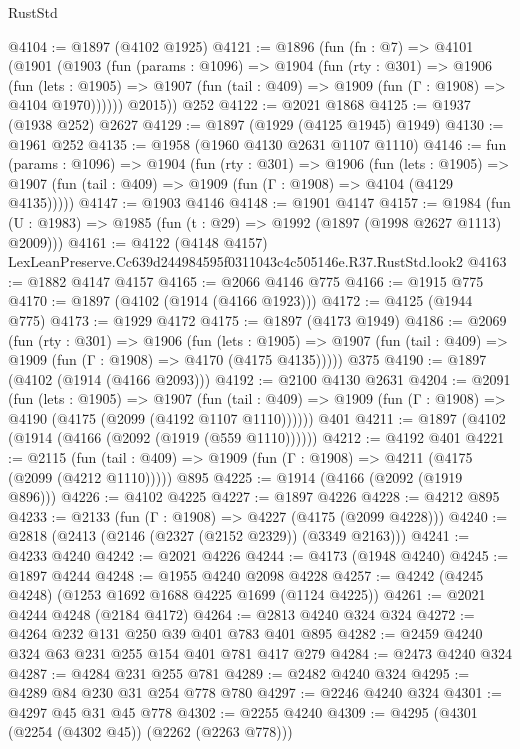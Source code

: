 \begin{lexlean}{RustStd}
\begin{coremodule}
@4104 := @1897 (@4102 @1925)
@4121 := @1896
    (fun (fn : @7) =>
    @4101
      (@1901
        (@1903
          (fun (params : @1096) =>
          @1904
            (fun (rty : @301) =>
            @1906
              (fun (lets : @1905) =>
              @1907 (fun (tail : @409) => @1909 (fun (Γ : @1908) => @4104 @1970))))))
        @2015))
    @252
@4122 := @2021 @1868
@4125 := @1937 (@1938 @252) @2627
@4129 := @1897 (@1929 (@4125 @1945) @1949)
@4130 := @1961 @252
@4135 := @1958 (@1960 @4130 @2631 @1107 @1110)
@4146 := fun (params : @1096) =>
  @1904
    (fun (rty : @301) =>
    @1906
      (fun (lets : @1905) =>
      @1907 (fun (tail : @409) => @1909 (fun (Γ : @1908) => @4104 (@4129 @4135)))))
@4147 := @1903 @4146
@4148 := @1901 @4147
@4157 := @1984 (fun (U : @1983) => @1985 (fun (t : @29) => @1992 (@1897 (@1998 @2627 @1113) @2009)))
@4161 := @4122 (@4148 @4157) LexLeanPreserve.Cc639d244984595f0311043c4c505146e.R37.RustStd.look2
@4163 := @1882 @4147 @4157
@4165 := @2066 @4146 @775
@4166 := @1915 @775
@4170 := @1897 (@4102 (@1914 (@4166 @1923)))
@4172 := @4125 (@1944 @775)
@4173 := @1929 @4172
@4175 := @1897 (@4173 @1949)
@4186 := @2069
    (fun (rty : @301) =>
    @1906
      (fun (lets : @1905) =>
      @1907 (fun (tail : @409) => @1909 (fun (Γ : @1908) => @4170 (@4175 @4135)))))
    @375
@4190 := @1897 (@4102 (@1914 (@4166 @2093)))
@4192 := @2100 @4130 @2631
@4204 := @2091
    (fun (lets : @1905) =>
    @1907
      (fun (tail : @409) => @1909 (fun (Γ : @1908) => @4190 (@4175 (@2099 (@4192 @1107 @1110))))))
    @401
@4211 := @1897 (@4102 (@1914 (@4166 (@2092 (@1919 (@559 @1110))))))
@4212 := @4192 @401
@4221 := @2115
    (fun (tail : @409) => @1909 (fun (Γ : @1908) => @4211 (@4175 (@2099 (@4212 @1110)))))
    @895
@4225 := @1914 (@4166 (@2092 (@1919 @896)))
@4226 := @4102 @4225
@4227 := @1897 @4226
@4228 := @4212 @895
@4233 := @2133 (fun (Γ : @1908) => @4227 (@4175 (@2099 @4228)))
@4240 := @2818 (@2413 (@2146 (@2327 (@2152 @2329)) (@3349 @2163)))
@4241 := @4233 @4240
@4242 := @2021 @4226
@4244 := @4173 (@1948 @4240)
@4245 := @1897 @4244
@4248 := @1955 @4240 @2098 @4228
@4257 := @4242 (@4245 @4248) (@1253 @1692 @1688 @4225 @1699 (@1124 @4225))
@4261 := @2021 @4244 @4248 (@2184 @4172)
@4264 := @2813 @4240 @324 @324
@4272 := @4264 @232 @131 @250 @39 @401 @783 @401 @895
@4282 := @2459 @4240 @324 @63 @231 @255 @154 @401 @781 @417 @279
@4284 := @2473 @4240 @324
@4287 := @4284 @231 @255 @781
@4289 := @2482 @4240 @324
@4295 := @4289 @84 @230 @31 @254 @778 @780
@4297 := @2246 @4240 @324
@4301 := @4297 @45 @31 @45 @778
@4302 := @2255 @4240
@4309 := @4295 (@4301 (@2254 (@4302 @45)) (@2262 (@2263 @778)))

\end{coremodule}
\end{lexlean}
